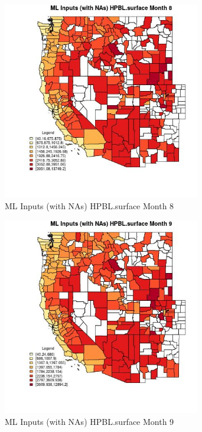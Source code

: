 \begin{figure} 
\centering  
\includegraphics[width=0.77\textwidth]{Code_Outputs/Report_ML_input_PM25_Step4_part_f_de_duplicated_aveswNAs_CountyHPBLsurfacemedianMonth8.jpg} 
\caption{\label{fig:Report_ML_input_PM25_Step4_part_f_de_duplicated_aveswNAsCountyHPBLsurfacemedianMonth8}ML Inputs (with NAs) HPBL.surface Month 8} 
\end{figure} 
 

\begin{figure} 
\centering  
\includegraphics[width=0.77\textwidth]{Code_Outputs/Report_ML_input_PM25_Step4_part_f_de_duplicated_aveswNAs_CountyHPBLsurfacemedianMonth9.jpg} 
\caption{\label{fig:Report_ML_input_PM25_Step4_part_f_de_duplicated_aveswNAsCountyHPBLsurfacemedianMonth9}ML Inputs (with NAs) HPBL.surface Month 9} 
\end{figure} 
 

